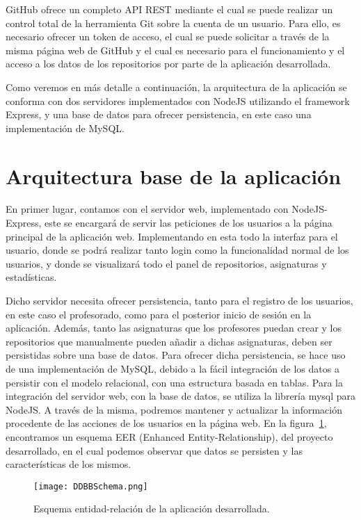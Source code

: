 GitHub ofrece un completo API REST mediante el cual se puede realizar un
control total de la herramienta Git sobre la cuenta de un usuario. Para
ello, es necesario ofrecer un token de acceso, el cual se puede solicitar a
través de la misma página web de GitHub y el cual es necesario para el
funcionamiento y el acceso a los datos de los repositorios por parte de la
aplicación desarrollada.

Como veremos en más detalle a continuación, la arquitectura de la
aplicación se conforma con dos servidores implementados con NodeJS
utilizando el framework Express, y una base de datos para ofrecer
persistencia, en este caso una implementación de MySQL.


\section{Arquitectura base de la aplicación}

En primer lugar, contamos con el servidor web, implementado con
NodeJS-Express, este se encargará de servir las peticiones de los usuarios
a la página principal de la aplicación web. Implementando en esta todo la
interfaz para el usuario, donde se podrá realizar tanto login como la
funcionalidad normal de los usuarios, y donde se visualizará todo el panel
de repositorios, asignaturas y estadísticas.

Dicho servidor necesita ofrecer persistencia, tanto para el registro de los
usuarios, en este caso el profesorado, como para el posterior inicio de
sesión en la aplicación. Además, tanto las asignaturas que los profesores
puedan crear y los repositorios que manualmente pueden añadir a dichas
asignaturas, deben ser persistidas sobre una base de datos. Para ofrecer
dicha persistencia, se hace uso de una implementación de MySQL, debido a la
fácil integración de los datos a persistir con el modelo relacional, con
una estructura basada en tablas. Para la integración del servidor web, con
la base de datos, se utiliza la librería mysql para NodeJS. A través de la
misma, podremos mantener y actualizar la información procedente de las
acciones de los usuarios en la página web. En la figura~\ref{figure:MySQLDraw}, encontramos un esquema EER (Enhanced Entity-Relationship), del proyecto desarrollado, en el cual podemos observar que datos se persisten y las características de los mismos.

\begin{figure}[h!]
  \texttt{[image: DDBBSchema.png]}
  \caption{Esquema entidad-relación de la aplicación desarrollada.}
  \label{figure:MySQLDraw}
\end{figure}

